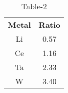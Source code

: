 \begin{table}[htbp]
  \centering
  \caption{Table-2}
  \label{tab:tables/table2.tex}
  \begin{tabular}{cc}
\textbf{Metal} & \textbf{Ratio} \\
Li & 0.57 \\
Ce & 1.16 \\
Ta & 2.33 \\
W & 3.40 \\
  \end{tabular}
\end{table}